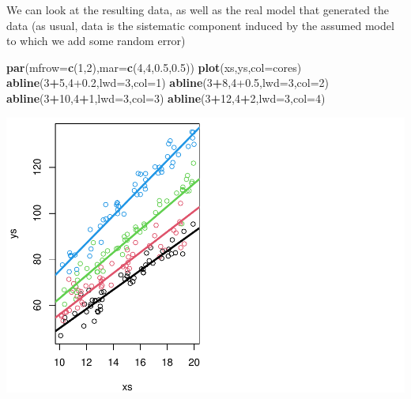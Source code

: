 \documentclass[
]{book}
\newenvironment{Shaded}{\begin{snugshade}}{\end{snugshade}}
\newcommand{\AttributeTok}[1]{\textcolor[rgb]{0.13,0.29,0.53}{#1}}
\newcommand{\DecValTok}[1]{\textcolor[rgb]{0.00,0.00,0.81}{#1}}
\newcommand{\FloatTok}[1]{\textcolor[rgb]{0.00,0.00,0.81}{#1}}
\newcommand{\FunctionTok}[1]{\textcolor[rgb]{0.13,0.29,0.53}{\textbf{#1}}}
\newcommand{\NormalTok}[1]{#1}
\newcommand{\SpecialCharTok}[1]{\textcolor[rgb]{0.81,0.36,0.00}{\textbf{#1}}}
\begin{document}
We can look at the resulting data, as well as the real model that generated the data (as usual, data is the sistematic component induced by the assumed model to which we add some random error)

\begin{Shaded}
\begin{Highlighting}[]
\FunctionTok{par}\NormalTok{(}\AttributeTok{mfrow=}\FunctionTok{c}\NormalTok{(}\DecValTok{1}\NormalTok{,}\DecValTok{2}\NormalTok{),}\AttributeTok{mar=}\FunctionTok{c}\NormalTok{(}\DecValTok{4}\NormalTok{,}\DecValTok{4}\NormalTok{,}\FloatTok{0.5}\NormalTok{,}\FloatTok{0.5}\NormalTok{))}
\FunctionTok{plot}\NormalTok{(xs,ys,}\AttributeTok{col=}\NormalTok{cores)}
\FunctionTok{abline}\NormalTok{(}\DecValTok{3}\SpecialCharTok{+}\DecValTok{5}\NormalTok{,}\DecValTok{4}\FloatTok{+0.2}\NormalTok{,}\AttributeTok{lwd=}\DecValTok{3}\NormalTok{,}\AttributeTok{col=}\DecValTok{1}\NormalTok{)}
\FunctionTok{abline}\NormalTok{(}\DecValTok{3}\SpecialCharTok{+}\DecValTok{8}\NormalTok{,}\DecValTok{4}\FloatTok{+0.5}\NormalTok{,}\AttributeTok{lwd=}\DecValTok{3}\NormalTok{,}\AttributeTok{col=}\DecValTok{2}\NormalTok{)}
\FunctionTok{abline}\NormalTok{(}\DecValTok{3}\SpecialCharTok{+}\DecValTok{10}\NormalTok{,}\DecValTok{4}\SpecialCharTok{+}\DecValTok{1}\NormalTok{,}\AttributeTok{lwd=}\DecValTok{3}\NormalTok{,}\AttributeTok{col=}\DecValTok{3}\NormalTok{)}
\FunctionTok{abline}\NormalTok{(}\DecValTok{3}\SpecialCharTok{+}\DecValTok{12}\NormalTok{,}\DecValTok{4}\SpecialCharTok{+}\DecValTok{2}\NormalTok{,}\AttributeTok{lwd=}\DecValTok{3}\NormalTok{,}\AttributeTok{col=}\DecValTok{4}\NormalTok{)}
\end{Highlighting}
\end{Shaded}

\includegraphics{ECOMODbook_files/figure-latex/a11.6-1.pdf}
\end{document}
